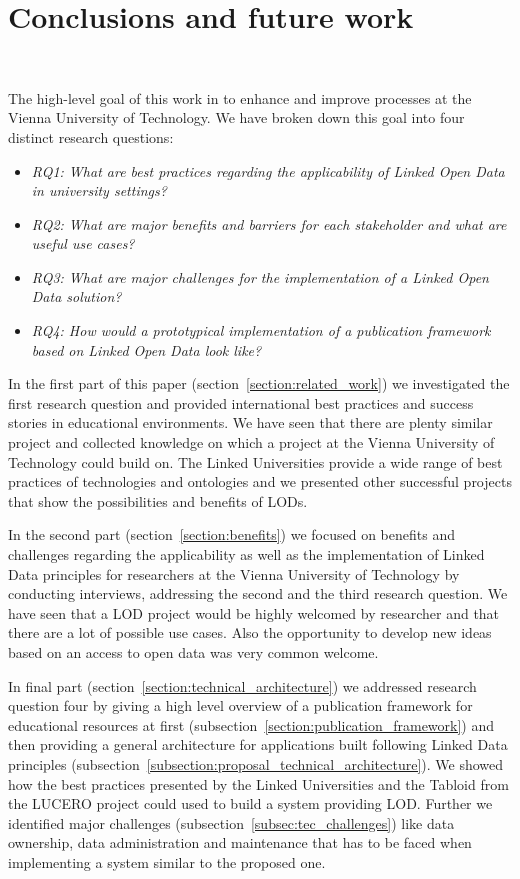 \section{Conclusions and future work}~\label{section:conclusion}

The high-level goal of this work in to enhance and improve processes at the Vienna University of Technology. We have broken down this goal into four distinct research questions:

\begin{itemize}
	\item \textit{RQ1: What are best practices regarding the applicability of Linked Open Data in university settings?}
	\item \textit{RQ2: What are major benefits and barriers for each stakeholder and what are useful use cases?}
	\item \textit{RQ3: What are major challenges for the implementation of a Linked Open Data solution?}
	\item \textit{RQ4: How would a prototypical implementation of a publication framework based on Linked Open Data look like?}
\end{itemize}

In the first part of this paper (section~\ref{section:related_work}) we investigated the first research question and provided international best practices and success stories in educational environments. We have seen that there are plenty similar project and collected knowledge on which a project at the Vienna University of Technology could build on. The Linked Universities provide a wide range of best practices of technologies and ontologies and we presented other successful projects that show the possibilities and benefits of LODs.

In the second part (section~\ref{section:benefits}) we focused on benefits and challenges regarding the applicability as well as the implementation of Linked Data principles for researchers at the Vienna University of Technology by conducting interviews, addressing the second and the third research question. We have seen that a LOD project would be highly welcomed by researcher and that there are a lot of possible use cases. Also the opportunity to develop new ideas based on an access to open data was very common welcome.

In final part (section~\ref{section:technical_architecture}) we addressed research question four by giving a high level overview of a publication framework for educational resources at first (subsection~\ref{section:publication_framework}) and then providing a general architecture for applications built following Linked Data principles (subsection~\ref{subsection:proposal_technical_architecture}). We showed how the best practices presented by the Linked Universities and the Tabloid from the LUCERO project could used to build a system providing LOD. Further we identified major challenges (subsection~\ref{subsec:tec_challenges}) like data ownership, data administration and maintenance that has to be faced when implementing a system similar to the proposed one.

